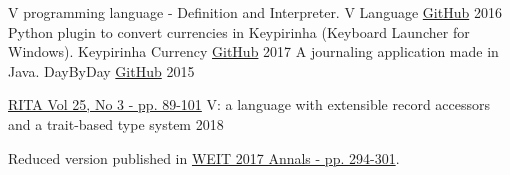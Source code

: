 

\begin{cventries}
  \cvcompactentry
    {V programming language - Definition and Interpreter.}
    {V Language}
    {\href{https://github.com/AvatarHurden/V}{GitHub}}
    {2016}
  \cvcompactentry
    {Python plugin to convert currencies in Keypirinha (Keyboard Launcher for Windows).}
    {Keypirinha Currency}
    {\href{https://github.com/AvatarHurden/keypirinha-currency}{GitHub}}
    {2017}
  \cvcompactentry
    {A journaling application made in Java.}
    {DayByDay}
    {\href{https://github.com/AvatarHurden/DayByDay}{GitHub}}
    {2015}

\end{cventries}

\newpage


\begin{cventries}
  \cventry
    {\href{http://seer.ufrgs.br/rita/article/view/VOL25_NR3_89}{RITA Vol 25, No 3 - pp. 89-101}}
    {V: a language with extensible record accessors and a trait-based type system}
    {2018}
    {}
    {
      \begin{cvitems}
        \item {Reduced version published in \href{http://weit2017.inf.ufsm.br/wp-content/uploads/2017/10/Versao_final.pdf}{WEIT 2017 Annals - pp. 294-301}}.
      \end{cvitems}
    }
\end{cventries}


